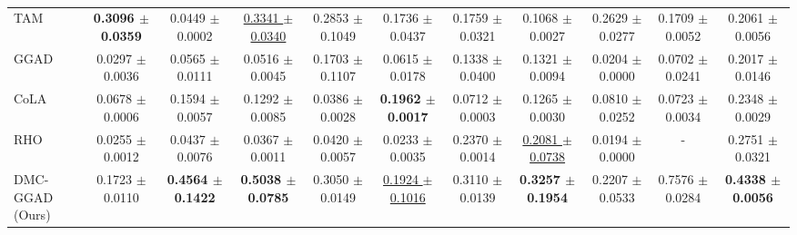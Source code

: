 ﻿﻿﻿﻿    \documentclass[conference, onecolumn]{IEEEtran}
\begin{document}
\begin{table}[htbp]
{\begin{tabular}{lcccccccccc}
        TAM & \textbf{0.3096 $\pm$ 0.0359} & 0.0449 $\pm$ 0.0002 & \underline{0.3341 $\pm$ 0.0340} & 0.2853 $\pm$ 0.1049 & 0.1736 $\pm$ 0.0437 & 0.1759 $\pm$ 0.0321 & 0.1068 $\pm$ 0.0027 & 0.2629 $\pm$ 0.0277 & 0.1709 $\pm$ 0.0052 & 0.2061 $\pm$ 0.0056 \\
        GGAD & 0.0297 $\pm$ 0.0036 & 0.0565 $\pm$ 0.0111 & 0.0516 $\pm$ 0.0045 & 0.1703 $\pm$ 0.1107 & 0.0615 $\pm$ 0.0178 & 0.1338 $\pm$ 0.0400 & 0.1321 $\pm$ 0.0094 & 0.0204 $\pm$ 0.0000 & 0.0702 $\pm$ 0.0241 & 0.2017 $\pm$ 0.0146 \\
        CoLA & 0.0678 $\pm$ 0.0006 & 0.1594 $\pm$ 0.0057 & 0.1292 $\pm$ 0.0085 & 0.0386 $\pm$ 0.0028 & \textbf{0.1962 $\pm$ 0.0017} & 0.0712 $\pm$ 0.0003 & 0.1265 $\pm$ 0.0030 & 0.0810 $\pm$ 0.0252 & 0.0723 $\pm$ 0.0034 & 0.2348 $\pm$ 0.0029 \\
        RHO & 0.0255 $\pm$ 0.0012 & 0.0437 $\pm$ 0.0076 & 0.0367 $\pm$ 0.0011 & 0.0420 $\pm$ 0.0057 & 0.0233 $\pm$ 0.0035 & 0.2370 $\pm$ 0.0014 & \underline{0.2081 $\pm$ 0.0738} & 0.0194 $\pm$ 0.0000 & - & 0.2751 $\pm$ 0.0321 \\
        \midrule
        DMC-GGAD (Ours) & 0.1723 $\pm$ 0.0110 & \textbf{0.4564 $\pm$ 0.1422} & \textbf{0.5038 $\pm$ 0.0785} & 0.3050 $\pm$ 0.0149 & \underline{0.1924 $\pm$ 0.1016} & 0.3110 $\pm$ 0.0139 & \textbf{0.3257 $\pm$ 0.1954} & 0.2207 $\pm$ 0.0533 & 0.7576 $\pm$ 0.0284 & \textbf{0.4338 $\pm$ 0.0056} \\
        \bottomrule
        \end{tabular}
    }
    \end{table}
    
\end{document}
